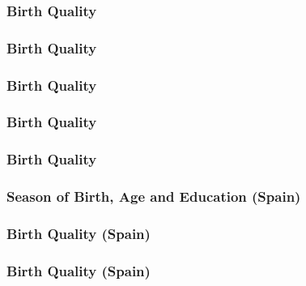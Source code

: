 \documentclass[10pt,letterpaper,subeqn]{beamer}
\begin{document}
\begin{frame}[label=NVSSQuality]
\frametitle{Birth Quality}

\end{frame}

\begin{frame}[label=NVSSQuality]
\frametitle{Birth Quality}

\end{frame}

\begin{frame}[label=NVSSQuality]
\frametitle{Birth Quality}

\end{frame}

\begin{frame}[label=NVSSQuality]
\frametitle{Birth Quality}

\end{frame}

\begin{frame}[label=NVSSQuality]
\frametitle{Birth Quality}

\end{frame}


\begin{frame}[label=Spainseason]
\frametitle{Season of Birth, Age and Education (Spain)}

\end{frame}

\begin{frame}[label=SpainQuality]
\frametitle{Birth Quality (Spain)}

\end{frame}

\begin{frame}[label=SpainQuality]
\frametitle{Birth Quality (Spain)}

\end{frame}
\end{document}
